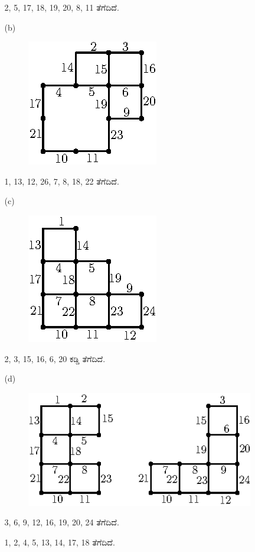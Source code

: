 \begin{enumerate}
\begin{itemize}
\begin{figure}[H]
\end{figure}
2, 5, 17, 18, 19, 20, 8, 11 ತೆಗೆದಿದೆ. 
\item[(b)] 
\begin{figure}[H]
\centering
\includegraphics{images/chap11/ans8b.eps}
\end{figure}
1, 13, 12, 26, 7, 8, 18, 22 ತೆಗೆದಿದೆ. 
\item[(c)] 
\begin{figure}[H]
\centering
\includegraphics{images/chap11/ans8c.eps}
\end{figure}
2, 3, 15, 16, 6, 20 ಕಡ್ಡಿ ತೆಗೆದಿದೆ. 
\item[(d)] 
\begin{figure}[H]
\centering
\includegraphics{images/chap11/ans8d.eps}
\end{figure}
3, 6, 9, 12, 16, 19, 20, 24 ತೆಗೆದಿದೆ.

1, 2, 4, 5, 13, 14, 17, 18 ತೆಗೆದಿದೆ.
\end{itemize}


\end{enumerate}

